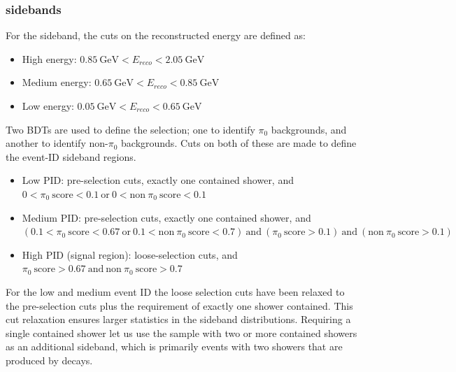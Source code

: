 \subsubsection{\npsel sidebands}

For the \npsel sideband, the cuts on the reconstructed energy are defined as:
\begin{itemize}
    \item High energy: $0.85 ~\text{GeV} < E_{reco} < 2.05 ~\text{GeV}$
    \item Medium energy: $0.65 ~\text{GeV} < E_{reco} < 0.85 ~\text{GeV}$
    \item Low energy: $0.05 ~\text{GeV} < E_{reco} < 0.65 ~\text{GeV}$
\end{itemize}

Two BDTs are used to define the \npsel selection; one to identify $\pi_0$ backgrounds, and another to identify non-$\pi_0$ backgrounds. Cuts on both of these are made to define the event-ID sideband regions. 
\begin{itemize}
    \item Low PID: pre-selection cuts, exactly one contained shower, and $0 < \pi_0~\text{score} < 0.1 ~\text{or}~ 0 < \text{non}~\pi_0~\text{score} < 0.1 $
    \item Medium PID: pre-selection cuts, exactly one contained shower, and $(0.1 < \pi_0~\text{score} < 0.67 ~\text{or}~ 0.1 < \text{non}~\pi_0~\text{score} < 0.7) ~\text{and}~  (\pi_0~\text{score} > 0.1) ~\text{and}~ (\text{non}~\pi_0~\text{score} > 0.1)$
    \item High PID (signal region): loose-selection cuts, and $ \pi_0~\text{score} > 0.67 ~\text{and}~ \text{non}~\pi_0~\text{score} > 0.7 $
\end{itemize}
For the low and medium event ID the loose selection cuts have been relaxed to the pre-selection cuts plus the requirement of exactly one shower contained.
This cut relaxation ensures larger statistics in the sideband distributions.
Requiring a single contained shower let us use the sample with two or more contained showers as an additional sideband, which is primarily events with two showers that are produced by \pizero decays.

